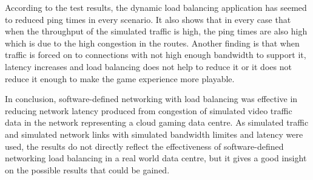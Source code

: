 \newline
\par
According to the test results, the dynamic load balancing application has seemed to reduced ping times in every scenario. It also shows that in every case that when the throughput of the simulated traffic is high, the ping times are also high which is due to the high congestion in the routes. Another finding is that when traffic is forced on to connections with not high enough bandwidth to support it, latency increases and load balancing does not help to reduce it or it does not reduce it enough to make the game experience more playable.
\newline
\par
In conclusion, software-defined networking with load balancing was effective in reducing network latency produced from congestion of simulated video traffic data in the network representing a cloud gaming data centre. As simulated traffic and simulated network links with simulated bandwidth limites and latency were used, the results do not directly reflect the effectiveness of software-defined networking load balancing in a real world data centre, but it gives a good insight on the possible results that could be gained.